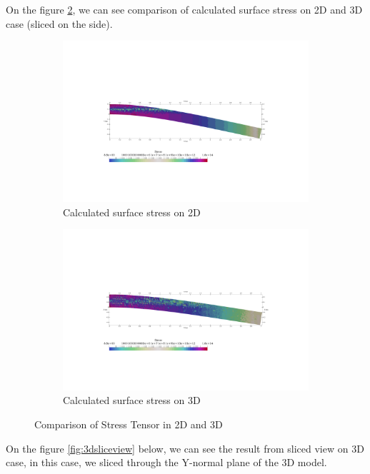 \documentclass[a4paper,11pt]{article}
\begin{document}
\newpage
On the figure \ref{fig:comparison}, we can see comparison of calculated surface stress on 2D and 3D case (sliced on the side).
\begin{figure}[h!]
	\begin{subfigure}[b]{0.5\linewidth}
		\centering
		\includegraphics[width=\linewidth]{picture/conference/2dstress1}
		\caption{Calculated surface stress on 2D}
	\end{subfigure}
	\quad
	\begin{subfigure}[b]{0.5\linewidth}
		\centering
		\includegraphics[width=\linewidth]{picture/conference/3dstress1}
		\caption{Calculated surface stress on 3D}
		\label{}
	\end{subfigure}
	\caption{Comparison of Stress Tensor in 2D and 3D}
	\label{fig:comparison}
\end{figure}
\newline
On the figure \ref{fig:3dsliceview} below, we can see the result from sliced view on 3D case, in this case, we sliced through the Y-normal plane of the 3D model.
\end{document}
